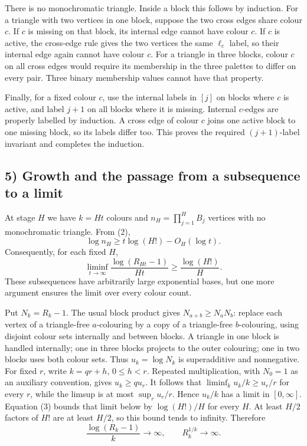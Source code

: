 There is no monochromatic triangle. Inside a block this follows by
induction. For a triangle with two vertices in one block, suppose the
two cross edges share colour $c$. If $c$ is missing on that block,
its internal edge cannot have colour $c$. If $c$ is active, the
cross-edge rule gives the two vertices the same $\ell_c$ label, so
their internal edge again cannot have colour $c$. For a triangle in
three blocks, colour $c$ on all cross edges would require its membership
in the three palettes to differ on every pair. Three binary membership
values cannot have that property.

Finally, for a fixed colour $c$, use the internal labels in $[j]$ on
blocks where $c$ is active, and label $j+1$ on all blocks where it is
missing. Internal $c$-edges are properly labelled by induction. A
cross edge of colour $c$ joins one active block to one missing block,
so its labels differ too. This proves the required $(j+1)$-label
invariant and completes the induction.

\subsection{5) Growth and the passage from a subsequence to a limit}
At stage $H$ we have $k=Ht$ colours and $n_H=\prod_{j=1}^H B_j$
vertices with no monochromatic triangle. From (2),
\[
 \log n_H\geq t\log(H!)-O_H(\log t).
\]
Consequently, for each fixed $H$,
\[
 \liminf_{t\to\infty}\frac{\log(R_{Ht}-1)}{Ht}
 \geq\frac{\log(H!)}H.                                 \tag{3}
\]
These subsequences have arbitrarily large exponential bases, but one
more argument ensures the limit over every colour count.

Put $N_k=R_k-1$. The usual block product gives
$N_{a+b}\geq N_aN_b$: replace each vertex of a triangle-free
$a$-colouring by a copy of a triangle-free $b$-colouring, using disjoint
colour sets internally and between blocks. A triangle in one block is
handled internally; one in three blocks projects to the outer colouring;
one in two blocks uses both colour sets.
Thus $u_k=\log N_k$ is superadditive and nonnegative. For fixed $r$,
write $k=qr+h$, $0\leq h<r$. Repeated multiplication, with $N_0=1$
as an auxiliary convention, gives $u_k\geq q u_r$. It follows that
$\liminf_k u_k/k\geq u_r/r$ for every $r$, while the limsup is at
most $\sup_r u_r/r$. Hence $u_k/k$ has a limit in $[0,\infty]$.
Equation (3) bounds that limit below by $\log(H!)/H$ for every $H$.
At least $H/2$ factors of $H!$ are at least $H/2$, so this bound tends
to infinity. Therefore
\[
 \frac{\log(R_k-1)}k\longrightarrow\infty,
 \qquad R_k^{1/k}\longrightarrow\infty.
\]


